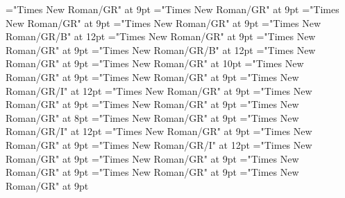 \documentclass[gps1,twoside]{article}
\begin{document}
\font\spanowningentrysummarydefinitioncomplexformsnotsubentrycomplexformsnotsubentriessensesensesentrylastchildafter="Times New Roman/GR" at 9pt
\font\nontrivialentryrootnontrivialentryrootnontrivialentryrootscomplexformsnotsubentrycomplexformsnotsubentriessensesensesentrybefore="Times New Roman/GR" at 9pt
\font\nontrivialentryrootscomplexformsnotsubentrycomplexformsnotsubentriessensesensesentrybefore="Times New Roman/GR" at 9pt
\font\nontrivialentryrootscomplexformsnotsubentrycomplexformsnotsubentriessensesensesentryafter="Times New Roman/GR" at 9pt
\font\nontrivialentryrootnontrivialentryrootscomplexformsnotsubentrycomplexformsnotsubentriessensesensesentry="Times New Roman/GR/B" at 12pt
\font\spanspansensecontentspansensessensesensesentrybefore="Times New Roman/GR" at 9pt
\font\sensessensesensesentryafter="Times New Roman/GR" at 9pt
\font\sensenumbersensecontentsensessensesensesentry="Times New Roman/GR/B" at 12pt
\font\sensenumbersensecontentsensessensesensesentryafter="Times New Roman/GR" at 9pt
\font\sensesensessensesensesentry="Times New Roman/GR" at 10pt
\font\sensetypesensesensessensesensesentrybefore="Times New Roman/GR" at 9pt
\font\sensetypesensesensessensesensesentryafter="Times New Roman/GR" at 9pt
\font\sensetypesensesensessensesensesentry="Times New Roman/GR/I" at 12pt
\font\spanspanabbreviationsensetypesensesensessensesensesentrybefore="Times New Roman/GR" at 9pt
\font\spanspandefinitionorglosssensesensessensesensesentrybefore="Times New Roman/GR" at 9pt
\font\spandefinitionorglosssensesensessensesensesentrylastchildafter="Times New Roman/GR" at 9pt
\font\exampleexampleexamplessensesensessensesensesentrybefore="Times New Roman/GR" at 8pt
\font\examplessensesensessensesensesentryafter="Times New Roman/GR" at 9pt
\font\spanbzhexampleexampleexamplessensesensessensesensesentry="Times New Roman/GR/I" at 12pt
\font\spanspanexampleexampleexamplessensesensessensesensesentrybefore="Times New Roman/GR" at 9pt
\font\spanexampleexampleexamplessensesensessensesensesentrylastchildafter="Times New Roman/GR" at 9pt
\font\spanexampleexampleexamplessensesensessensesensesentry="Times New Roman/GR/I" at 12pt
\font\spanspantranslationtranslationtranslationsexampleexamplessensesensessensesensesentrybefore="Times New Roman/GR" at 9pt
\font\spantranslationtranslationtranslationsexampleexamplessensesensessensesensesentrylastchildafter="Times New Roman/GR" at 9pt
\font\spanspanencyclopedicinfosensesensessensesensesentrybefore="Times New Roman/GR" at 9pt
\font\spanencyclopedicinfosensesensessensesensesentryfirstchildbefore="Times New Roman/GR" at 9pt
\font\spanencyclopedicinfosensesensessensesensesentrylastchildafter="Times New Roman/GR" at 9pt
\end{document}
